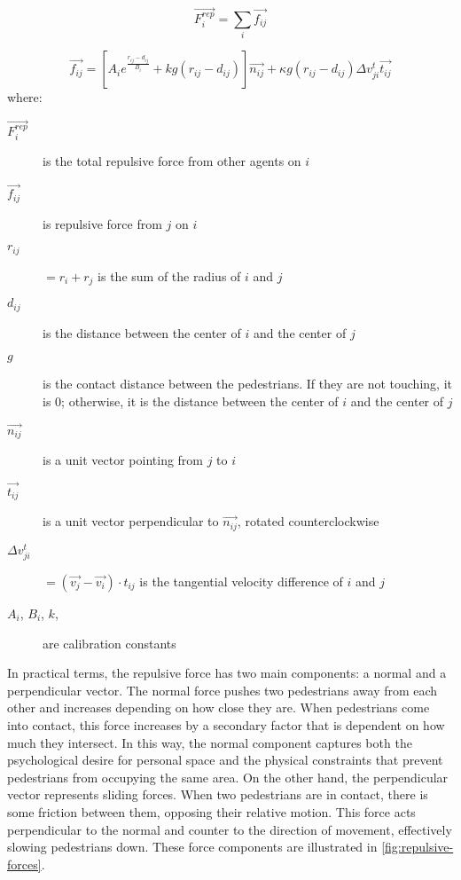 \documentclass[twoside, 11pt]{article}
\begin{document}
\begin{equation}
  \vec{F_i^{rep}} = \sum_i\vec{f_{ij}}
  \label{eq:pedestrian_repulsion_total}
\end{equation}

\begin{equation}
  \vec{f_{ij}} = [A_ie^{\frac{r_{ij} - d_{ij}}{B_i}} + kg(r_{ij}-d_{ij})]\vec{n_{ij}} + \kappa g (r_{ij} - d_{ij})\Delta v_{ji}^t \vec{t_{ij}}
  \label{eq:pedestrian_repulsion}
\end{equation}
where:
\begin{description}
  \item[$\vec{F_i^{rep}}$] is the total repulsive force from other agents on $i$
  \item[$\vec{f_{ij}}$] is repulsive force from $j$ on $i$
  
  \item[$r_{ij}$] $= r_i + r_j$ is the sum of the radius of $i$ and $j$
  \item[$d_{ij}$] is the distance between the center of $i$ and the center of $j$
  \item[$g$] is the contact distance between the pedestrians. If they are not touching, it is $0$; otherwise, it is the distance between the center of $i$ and the center of $j$
  \item[$\vec{n_{ij}}$] is a unit vector pointing from $j$ to $i$
  \item[$\vec{t_{ij}}$] is a unit vector perpendicular to $\vec{n_{ij}}$, rotated counterclockwise
  \item[$\Delta v_{ji}^t$] $= (\vec{v_j} - \vec{v_i}) \cdot t_{ij}$ is the tangential velocity difference of $i$ and $j$
  \item[$A_i$, $B_i$, $k$, \kappa] are calibration constants
\end{description}

In practical terms, the repulsive force has two main components: a normal and a perpendicular vector. The normal force pushes two pedestrians away from each other and increases depending on how close they are. When pedestrians come into contact, this force increases by a secondary factor that is dependent on how much they intersect. In this way, the normal component captures both the psychological desire for personal space and the physical constraints that prevent pedestrians from occupying the same area. On the other hand, the perpendicular vector represents sliding forces. When two pedestrians are in contact, there is some friction between them, opposing their relative motion. This force acts perpendicular to the normal and counter to the direction of movement, effectively slowing pedestrians down. These force components are illustrated in \autoref{fig:repulsive-forces}.
\end{document}
